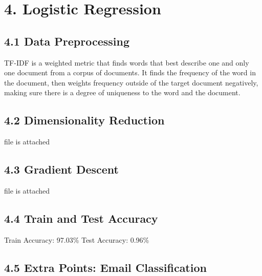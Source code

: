 \documentclass[12pt]{article}
\begin{document}
\section*{4. Logistic Regression}
\subsection*{4.1 Data Preprocessing}

TF-IDF is a weighted metric that finds words that best describe one and only one document from a corpus of documents. It finds the frequency of the word in the document, then weights frequency outside of the target document negatively, making sure there is a degree of uniqueness to the word and the document.

\subsection*{4.2 Dimensionality Reduction}
file is attached

\subsection*{4.3 Gradient Descent}
file is attached

\subsection*{4.4 Train and Test Accuracy}
Train Accuracy: 97.03\%
Test Accuracy: 0.96\%

\subsection*{4.5 Extra Points: Email Classification}
\end{document}
